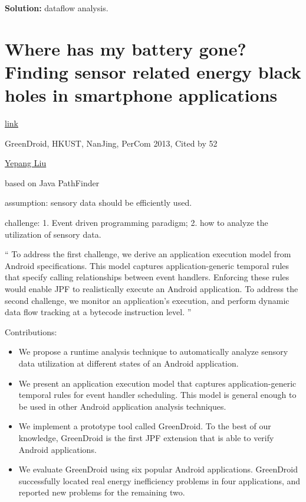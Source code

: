 \documentclass{article}
\begin{document}
\textbf{Solution:
}dataflow analysis. %



\section{Where has my battery gone? Finding sensor related energy black holes in
  smartphone applications}

\href{http://ieeexplore.ieee.org/abstract/document/6526708/}{link}

GreenDroid, HKUST, NanJing, PerCom 2013, Cited by 52

\href{http://www.cse.ust.hk/~andrewust/}{Yepang Liu}

based on Java PathFinder

assumption: sensory data should be efficiently used.

challenge: 1. Event driven programming paradigm; 2. how to analyze the
utilization of sensory data.

`` To address the first challenge, we derive an application execution model from
Android specifications. This model captures application-generic temporal rules
that specify calling relationships between event handlers. Enforcing these rules
would enable JPF to realistically execute an Android application. To address the
second challenge, we monitor an application’s execution, and perform dynamic
data flow tracking at a bytecode instruction level. ''

Contributions:
\begin{itemize}
\item We propose a runtime analysis technique to automatically analyze sensory
  data utilization at different states of an Android application.
\item We present an application execution model that captures
  application-generic temporal rules for event handler scheduling. This model is
  general enough to be used in other Android application analysis techniques.
\item We implement a prototype tool called GreenDroid. To the best of our
  knowledge, GreenDroid is the first JPF extension that is able to verify
  Android applications.
\item We evaluate GreenDroid using six popular Android applications. GreenDroid
  successfully located real energy inefficiency problems in four applications,
  and reported new problems for the remaining two.
\end{itemize}
\end{document}
